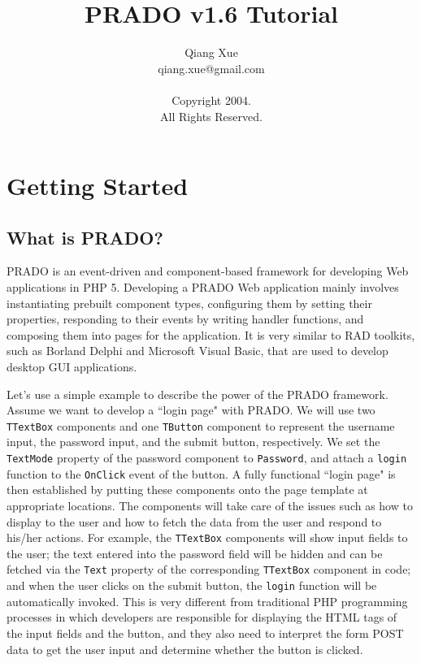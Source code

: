 \documentclass{book}
\begin{document}
\title{PRADO v1.6 Tutorial}
\author{Qiang Xue\\ qiang.xue@gmail.com\\ \\ Copyright 2004.\\ All Rights
Reserved.}
\maketitle

\tableofcontents

\chapter{Getting Started}
\section{What is PRADO?}

PRADO is an event-driven and component-based framework for
developing Web applications in PHP 5. Developing a PRADO Web
application mainly involves instantiating prebuilt component
types, configuring them by setting their properties, responding to
their events by writing handler functions, and composing them into
pages for the application. It is very similar to RAD toolkits,
such as Borland Delphi and Microsoft Visual Basic, that are used
to develop desktop GUI applications.


Let's use a simple example to describe the power of the PRADO
framework. Assume we want to develop a ``login page" with PRADO.
We will use two \verb|TTextBox| components and one \verb|TButton|
component to represent the username input, the password input, and
the submit button, respectively. We set the \verb|TextMode|
property of the password component to \verb|Password|, and attach
a \verb|login| function to the \verb|OnClick| event of the button.
A fully functional ``login page" is then established by putting
these components onto the page template at appropriate locations.
The components will take care of the issues such as how to display
to the user and how to fetch the data from the user and respond to
his/her actions. For example, the \verb|TTextBox| components will
show input fields to the user; the text entered into the password
field will be hidden and can be fetched via the \verb|Text|
property of the corresponding \verb|TTextBox| component in code;
and when the user clicks on the submit button, the \verb|login|
function will be automatically invoked. This is very different
from traditional PHP programming processes in which developers are
responsible for displaying the HTML tags of the input fields and
the button, and they also need to interpret the form POST data to
get the user input and determine whether the button is clicked.
\end{document}
